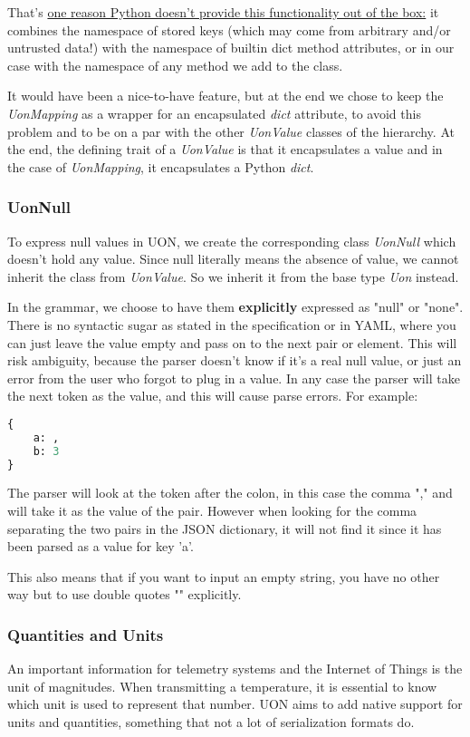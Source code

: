 \documentclass[12pt]{article}
\begin{document}
That's \href{https://stackoverflow.com/questions/4984647/accessing-dict-keys-like-an-attribute}{one reason Python doesn't provide this functionality out of the box:} it combines the namespace of stored keys (which may come from arbitrary and/or untrusted data!) with the namespace of builtin dict method attributes, or in our case with the namespace of any method we add to the class.

It would have been a nice-to-have feature, but at the end we chose to keep the \emph{UonMapping} as a wrapper for an encapsulated \emph{dict} attribute, to avoid this problem and to be on a par with the other \emph{UonValue} classes of the hierarchy. At the end, the defining trait of a \emph{UonValue} is that it encapsulates a value and in the case of \emph{UonMapping}, it encapsulates a Python \emph{dict}.

\subsubsection{UonNull}
To express null values in UON, we create the corresponding class \emph{UonNull} which doesn't hold any value. Since null literally means the absence of value, we cannot inherit the class from \emph{UonValue}. So we inherit it from the base type \emph{Uon} instead.

In the grammar, we choose to have them \textbf{explicitly} expressed as "null" or "none". There is no syntactic sugar as stated in the specification or in YAML, where you can just leave the value empty and pass on to the next pair or element. This will risk ambiguity, because the parser doesn't know if it's a real null value, or just an error from the user who forgot to plug in a value. In any case the parser will take the next token as the value, and this will cause parse errors. For example:
\begin{lstlisting}[language=Python]
{
    a: ,
    b: 3
}
\end{lstlisting}

The parser will look at the token after the colon, in this case the comma "," and will take it as the value of the pair. However when looking for the comma separating the two pairs in the JSON dictionary, it will not find it since it has been parsed as a value for key 'a'. 

This also means that if you want to input an empty string, you have no other way but to use double quotes "" explicitly.

\subsubsection{Quantities and Units}
An important information for telemetry systems and the Internet of Things is the unit of magnitudes. When transmitting a temperature, it is essential to know which unit is used to represent that number. UON aims to add native support for units and quantities, something that not a lot of serialization formats do.
\end{document}
